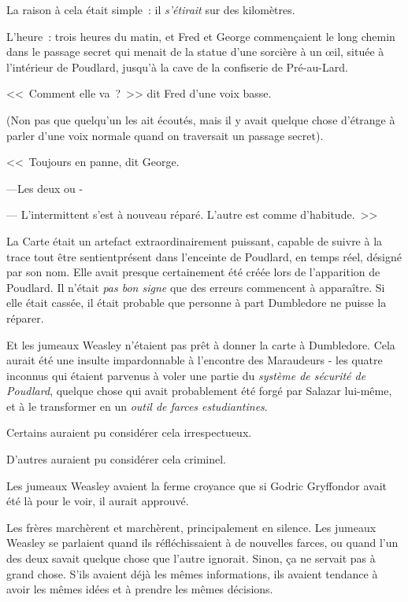 La raison à cela était simple~: il \emph{s'étirait} sur des kilomètres.

L'heure~: trois heures du matin, et Fred et George commençaient le long chemin dans le passage secret qui menait de la statue d'une sorcière à un œil, située à l'intérieur de Poudlard, jusqu'à la cave de la confiserie de Pré-au-Lard.

<<~Comment elle va~?~>> dit Fred d'une voix basse.

(Non pas que quelqu'un les ait écoutés, mais il y avait quelque chose d'étrange à parler d'une voix normale quand on traversait un passage secret).

<<~Toujours en panne, dit George.

---Les deux ou -

--- L'intermittent s'est à nouveau réparé. L'autre est comme d'habitude.~>>

La Carte était un artefact extraordinairement puissant, capable de suivre à la trace tout être sentient\protect\footnotemark présent dans l'enceinte de Poudlard, en temps réel, désigné par son nom. Elle avait presque certainement été créée lors de l'apparition de Poudlard. Il n'était \emph{pas bon signe} que des erreurs commencent à apparaître. Si elle était cassée, il était probable que personne à part Dumbledore ne puisse la réparer.

Et les jumeaux Weasley n'étaient pas prêt à donner la carte à Dumbledore. Cela aurait été une insulte impardonnable à l'encontre des Maraudeurs - les quatre inconnus qui étaient parvenus à voler une partie du \emph{système de sécurité de Poudlard}, quelque chose qui avait probablement été forgé par Salazar lui-même, et à le transformer en un \emph{outil de farces estudiantines}.

Certains auraient pu considérer cela irrespectueux.

D'autres auraient pu considérer cela criminel.

Les jumeaux Weasley avaient la ferme croyance que si Godric Gryffondor avait été là pour le voir, il aurait approuvé.

Les frères marchèrent et marchèrent, principalement en silence. Les jumeaux Weasley se parlaient quand ils réfléchissaient à de nouvelles farces, ou quand l'un des deux savait quelque chose que l'autre ignorait. Sinon, ça ne servait pas à grand chose. S'ils avaient déjà les mêmes informations, ils avaient tendance à avoir les mêmes idées et à prendre les mêmes décisions.

